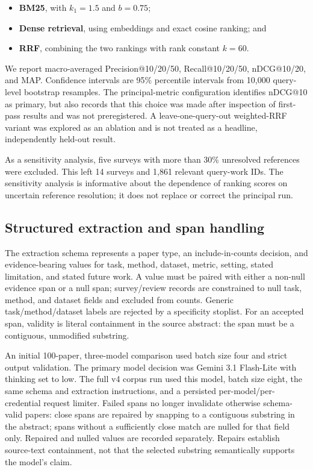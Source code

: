 \documentclass[sigconf,review,anonymous]{acmart}
\begin{document}
\begin{itemize}
\item \textbf{BM25}, with \(k_1=1.5\) and \(b=0.75\);
\item \textbf{Dense retrieval}, using \texttt{} embeddings and exact cosine ranking; and
\item \textbf{RRF}, combining the two rankings with rank constant \(k=60\).
\end{itemize}
We report macro-averaged Precision@10/20/50, Recall@10/20/50, nDCG@10/20, and MAP. Confidence intervals are 95\% percentile intervals from 10,000 query-level bootstrap resamples. The principal-metric configuration identifies nDCG@10 as primary, but also records that this choice was made after inspection of first-pass results and was not preregistered. A leave-one-query-out weighted-RRF variant was explored as an ablation and is not treated as a headline, independently held-out result.

As a sensitivity analysis, five surveys with more than 30\% unresolved references were excluded. This left 14 surveys and 1,861 relevant query-work IDs. The sensitivity analysis is informative about the dependence of ranking scores on uncertain reference resolution; it does not replace or correct the principal run.

\subsection{Structured extraction and span handling}
The extraction schema represents a paper type, an include-in-counts decision, and evidence-bearing values for task, method, dataset, metric, setting, stated limitation, and stated future work. A value must be paired with either a non-null evidence span or a null span; survey/review records are constrained to null task, method, and dataset fields and excluded from counts. Generic task/method/dataset labels are rejected by a specificity stoplist. For an accepted span, validity is literal containment in the source abstract: the span must be a contiguous, unmodified substring.

An initial 100-paper, three-model comparison used batch size four and strict output validation. The primary model decision was Gemini 3.1 Flash-Lite with thinking set to low. The full v4 corpus run used this model, batch size eight, the same schema and extraction instructions, and a persisted per-model/per-credential request limiter. Failed spans no longer invalidate otherwise schema-valid papers: close spans are repaired by snapping to a contiguous substring in the abstract; spans without a sufficiently close match are nulled for that field only. Repaired and nulled values are recorded separately. Repairs establish source-text containment, not that the selected substring semantically supports the model’s claim.
\end{document}

